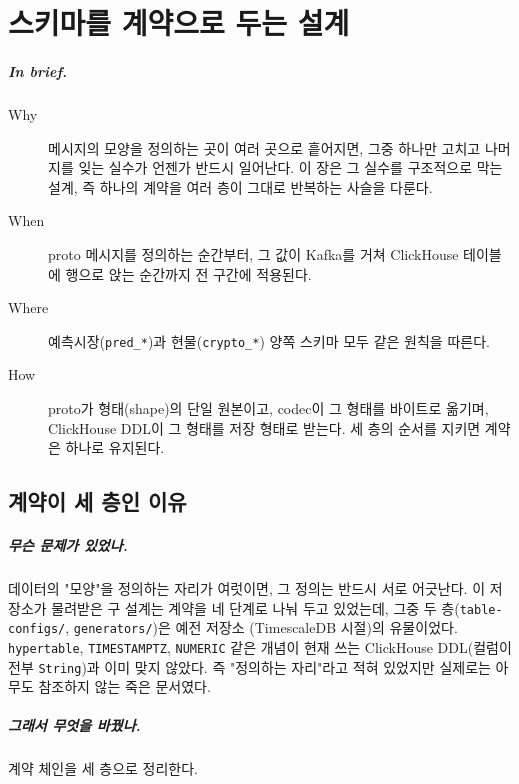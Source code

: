 \chapter{스키마를 계약으로 두는 설계}
\label{ch:contract}

\paragraph{In brief.}
\begin{description}
  \item[Why] 메시지의 모양을 정의하는 곳이 여러 곳으로 흩어지면, 그중 하나만 고치고
    나머지를 잊는 실수가 언젠가 반드시 일어난다. 이 장은 그 실수를 구조적으로 막는
    설계, 즉 하나의 계약을 여러 층이 그대로 반복하는 사슬을 다룬다.
  \item[When] proto 메시지를 정의하는 순간부터, 그 값이 Kafka를 거쳐 ClickHouse
    테이블에 행으로 앉는 순간까지 전 구간에 적용된다.
  \item[Where] 예측시장(\texttt{pred\_*})과 현물(\texttt{crypto\_*}) 양쪽 스키마
    모두 같은 원칙을 따른다.
  \item[How] proto가 형태(shape)의 단일 원본이고, codec이 그 형태를 바이트로 옮기며,
    ClickHouse DDL이 그 형태를 저장 형태로 받는다. 세 층의 순서를 지키면 계약은
    하나로 유지된다.
\end{description}

\section{계약이 세 층인 이유}
\label{sec:contract-chain}

\paragraph{무슨 문제가 있었나.} 데이터의 "모양"을 정의하는 자리가 여럿이면, 그 정의는
반드시 서로 어긋난다. 이 저장소가 물려받은 구 설계는 계약을 네 단계로 나눠 두고
있었는데, 그중 두 층(\texttt{table-configs/}, \texttt{generators/})은 예전 저장소
(TimescaleDB 시절)의 유물이었다. \texttt{hypertable}, \texttt{TIMESTAMPTZ},
\texttt{NUMERIC} 같은 개념이 현재 쓰는 ClickHouse DDL(컬럼이 전부 \texttt{String})과
이미 맞지 않았다. 즉 "정의하는 자리"라고 적혀 있었지만 실제로는 아무도 참조하지
않는 죽은 문서였다.

\paragraph{그래서 무엇을 바꿨나.} 계약 체인을 세 층으로 정리한다.

